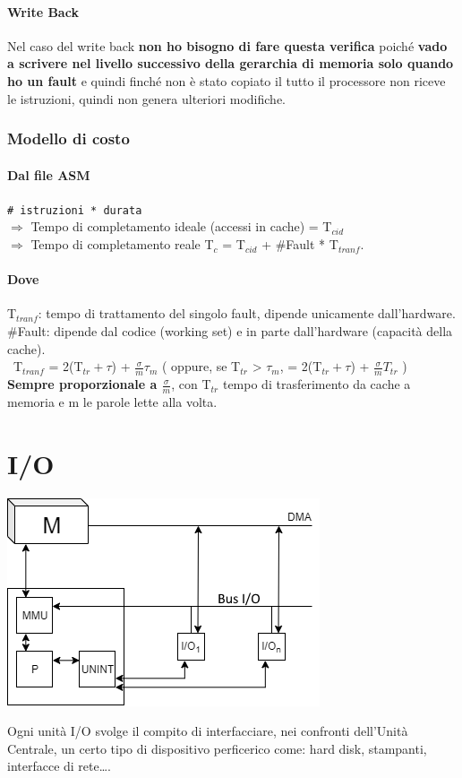 \documentclass[10pt]{report}
\begin{document}
\paragraph{Write Back} Nel caso del write back \textbf{non ho bisogno di fare questa verifica} poiché \textbf{vado a scrivere nel livello successivo della gerarchia di memoria solo quando ho un fault} e quindi finché non è stato copiato il tutto il processore non riceve le istruzioni, quindi non genera ulteriori modifiche.
\subsubsection{Modello di costo}
\paragraph{Dal file ASM} \texttt{\# istruzioni * durata}\\
$\Rightarrow$ Tempo di completamento ideale (accessi in cache) = T$_{cid}$\\
$\Rightarrow$ Tempo di completamento reale T$_c$ = T$_{cid}$ + \#Fault * T$_{tranf}$.
\paragraph{Dove} T$_{tranf}$: tempo di trattamento del singolo fault, dipende unicamente dall'hardware.\\
\#Fault: dipende dal codice (working set) e in parte dall'hardware (capacità della cache).\\\
T$_{tranf}$ = 2(T$_{tr} + \tau$) + $\frac{\sigma}{m}\tau_m$ ( oppure, se T$_{tr}$ > $\tau_m$, = 2(T$_{tr} + \tau$) + $\frac{\sigma}{m}T_{tr}$ )\\
\textbf{Sempre proporzionale a $\frac{\sigma}{m}$}, con T$_{tr}$ tempo di trasferimento da cache a memoria e m le parole lette alla volta.
\section{I/O}
\begin{center}
	\includegraphics[scale=1]{procuf.png}
\end{center}
\pagebreak
Ogni unità I/O svolge il compito di interfacciare, nei confronti dell'Unità Centrale, un certo tipo di dispositivo perficerico come: hard disk, stampanti, interfacce di rete\ldots.\\
\end{document}
